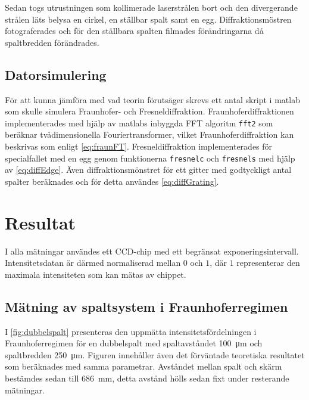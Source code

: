 \documentclass[a4paper]{article}
\begin{document}
  Sedan togs utrustningen som kollimerade laserstrålen bort och den divergerande strålen läts belysa en cirkel, en ställbar spalt samt en egg. Diffraktionsmöstren fotograferades och för den ställbara spalten filmades förändringarna då spaltbredden förändrades.
  
  \subsection{Datorsimulering}
  
  För att kunna jämföra med vad teorin förutsäger skrevs ett antal skript i matlab som skulle simulera Fraunhofer- och Fresneldiffraktion. Fraunhoferdiffraktionen implementerades med hjälp av matlabs inbyggda FFT algoritm \lstinline{fft2} som beräknar tvådimensionella Fouriertransformer, vilket Fraunhoferdiffraktion kan beskrivas som enligt \eqref{eq:fraunFT}. Fresneldiffraktion implementerades för specialfallet med en egg genom funktionerna  \lstinline{fresnelc} och \lstinline{fresnels} med hjälp av \eqref{eq:diffEdge}. Även diffraktionsmönstret för ett gitter med godtyckligt antal spalter beräknades och för detta användes \eqref{eq:diffGrating}.

\section{Resultat}

I alla mätningar användes ett CCD-chip med ett begränsat exponeringsintervall. Intensitetsdatan är därmed normaliserad mellan $0$ och $1$, där $1$ representerar den maximala intensiteten som kan mätas av chippet.

\subsection{Mätning av spaltsystem i Fraunhoferregimen}

I \autoref{fig:dubbelspalt} presenteras den uppmätta intensitetsfördelningen i Fraunhoferregimen för en dubbelspalt med spaltavståndet \SI{100}{\micro\m} och spaltbredden \SI{250}{\micro\m}. Figuren innehåller även det förväntade teoretiska resultatet som beräknades med samma parametrar. Avståndet mellan spalt och skärm bestämdes sedan till \SI{686}{\milli\m},  detta avstånd hölls sedan fixt under resterande mätningar.

\FloatBarrier
\end{document}

